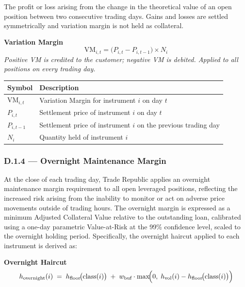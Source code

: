 \documentclass[9pt, a4paper]{extarticle}
\newenvironment{formulabox}{\par\addvspace{4pt}}{\par\addvspace{4pt}}
\newcommand{\vartableheader}{%
    \textbf{Symbol} & \textbf{Description}\\
}
\begin{document}
The profit or loss arising from the change in the theoretical value of an open
position between two consecutive trading days. Gains and losses are settled
symmetrically and variation margin is not held as collateral.

\begin{formulabox}
\textbf{Variation Margin}
\begin{equation*}
    \mathrm{VM}_{i,t} =
        \bigl(P_{i,t} - P_{i,t-1}\bigr) \times N_i
\end{equation*}
\textit{Positive VM is credited to the customer; negative VM is debited.
Applied to all positions on every trading day.}
\end{formulabox}

\begin{tabularx}{\linewidth}{lX}
\toprule
\vartableheader
\midrule
$\mathrm{VM}_{i,t}$  & Variation Margin for instrument $i$ on day $t$ \\
$P_{i,t}$            & Settlement price of instrument $i$ on day $t$ \\
$P_{i,t-1}$          & Settlement price of instrument $i$ on the previous trading day \\
$N_i$                & Quantity held of instrument $i$ \\
\bottomrule
\end{tabularx}

\subsubsection{D.1.4 — Overnight Maintenance Margin}

At the close of each trading day, Trade Republic applies an overnight maintenance
margin requirement to all open leveraged positions, reflecting the increased risk
arising from the inability to monitor or act on adverse price movements outside of
trading hours. The overnight margin is expressed as a minimum Adjusted Collateral
Value relative to the outstanding loan, calibrated using a one-day parametric
Value-at-Risk at the 99\% confidence level, scaled to the overnight holding period.
Specifically, the overnight haircut applied to each instrument is derived as:

\begin{formulabox}
\textbf{Overnight Haircut}
\begin{equation*}
    h_{\text{overnight}}(i) \;=\;
        h_{\text{floor}}\!\bigl(\text{class}(i)\bigr)
        \;+\;
        w_{\text{buf}} \cdot
        \max\!\Bigl(0,\; h_{\text{vol}}(i) - h_{\text{floor}}\!\bigl(\text{class}(i)\bigr)\Bigr)
\end{equation*}
\end{formulabox}
\end{document}

